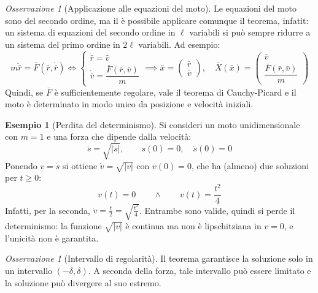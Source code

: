 \documentclass[11pt, a4paper, openright]{book}
\theoremstyle{plain}
\theoremstyle{definition}
\newtheorem{esempio}[teorema]{Esempio}
\theoremstyle{remark}
\newtheorem{osservazione}[teorema]{Osservazione}
\begin{document}
\begin{osservazione}[Applicazione alle equazioni del moto]
    Le equazioni del moto sono del secondo ordine, ma il è possibile applicare comunque il teorema, infatit: un sistema di equazioni del secondo ordine in $\ell$ variabili si può sempre ridurre a un sistema del primo ordine in $2\ell$ variabili. Ad esempio:
    \begin{equation}
        m\ddot{\bar{r}} = \bar{F}(\bar{r}, \dot{\bar{r}}) \iff
        \begin{cases}
            \dot{\bar{r}} = \bar{v} \\
            \dot{\bar{v}} = \dfrac{\bar{F}(\bar{r}, \bar{v})}{m}
        \end{cases}
        \implies
        \bar{x} = \begin{pmatrix} \bar{r} \\ \bar{v} \end{pmatrix}, \quad
        \bar{X}(\bar{x}) = \begin{pmatrix} \bar{v} \\ \dfrac{\bar{F}(\bar{r}, \bar{v})}{m} \end{pmatrix}
    \end{equation}
    Quindi, se $\bar{F}$ è sufficientemente regolare, vale il teorema di Cauchy-Picard e il moto è determinato in modo unico da posizione e velocità iniziali.
\end{osservazione}

\begin{esempio}[Perdita del determinismo]
    Si consideri un moto unidimensionale con $m = 1$ e una forza che dipende dalla velocità:
    \begin{equation}
        \ddot{s} = \sqrt{|\dot{s}|}, \qquad s(0) = 0, \quad \dot{s}(0) = 0
    \end{equation}
    Ponendo $v = \dot{s}$ si ottiene $\dot{v} = \sqrt{|v|}$ con $v(0) = 0$, che ha (almeno) due soluzioni per $t \geq 0$:
    \begin{equation}
        v(t) = 0 \qquad \wedge \qquad v(t) = \frac{t^2}{4}
    \end{equation}
    Infatti, per la seconda, $\dot{v} = \frac{t}{2} = \sqrt{\frac{t^2}{4}}$. Entrambe sono valide, quindi si perde il determinismo: la funzione $\sqrt{|v|}$ è continua ma non è lipschitziana in $v = 0$, e l'unicità non è garantita.
\end{esempio}

\begin{osservazione}[Intervallo di regolarità]
    Il teorema garantisce la soluzione solo in un intervallo $(-\delta, \delta)$. A seconda della forza, tale intervallo può essere limitato e la soluzione può divergere al suo estremo.
\end{osservazione}
\end{document}

